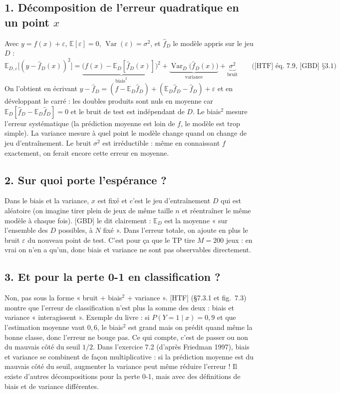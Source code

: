 \documentclass[10pt,a4paper]{article}
\begin{document}
\subsection*{1. Décomposition de l'erreur quadratique en un point $x$}
Avec $y = f(x) + \varepsilon$, $\mathbb{E}[\varepsilon]=0$, $\operatorname{Var}(\varepsilon)=\sigma^2$, et $\hat f_D$ le modèle appris sur le jeu $D$ :
\[
\mathbb{E}_{D,\varepsilon}\big[(y-\hat f_D(x))^2\big]
= \underbrace{\big(f(x)-\mathbb{E}_D[\hat f_D(x)]\big)^2}_{\text{biais}^2}
+ \underbrace{\operatorname{Var}_D\big(\hat f_D(x)\big)}_{\text{variance}}
+ \underbrace{\sigma^2}_{\text{bruit}}
\qquad\text{([HTF] éq.~7.9, [GBD] §3.1)}
\]
On l'obtient en écrivant $y-\hat f_D = (f-\mathbb{E}_D\hat f_D) + (\mathbb{E}_D\hat f_D - \hat f_D) + \varepsilon$ et en développant le carré : les doubles produits sont nuls en moyenne car $\mathbb{E}_D[\hat f_D - \mathbb{E}_D\hat f_D]=0$ et le bruit de test est indépendant de $D$.
Le biais$^2$ mesure l'erreur systématique (la prédiction moyenne est loin de $f$, le modèle est trop simple). La variance mesure à quel point le modèle change quand on change de jeu d'entraînement. Le bruit $\sigma^2$ est irréductible : même en connaissant $f$ exactement, on ferait encore cette erreur en moyenne.

\subsection*{2. Sur quoi porte l'espérance ?}
Dans le biais et la variance, $x$ est fixé et c'est le jeu d'entraînement $D$ qui est aléatoire (on imagine tirer plein de jeux de même taille $n$ et réentraîner le même modèle à chaque fois). [GBD] le dit clairement : $\mathbb{E}_D$ est la moyenne « sur l'ensemble des $D$ possibles, à $N$ fixé ». Dans l'erreur totale, on ajoute en plus le bruit $\varepsilon$ du nouveau point de test. C'est pour ça que le TP tire $M=200$ jeux : en vrai on n'en a qu'un, donc biais et variance ne sont pas observables directement.

\subsection*{3. Et pour la perte 0-1 en classification ?}
Non, pas sous la forme « bruit + biais$^2$ + variance ». [HTF] (§7.3.1 et fig.~7.3) montre que l'erreur de classification n'est plus la somme des deux : biais et variance « interagissent ». Exemple du livre : si $P(Y=1\mid x)=0{,}9$ et que l'estimation moyenne vaut $0{,}6$, le biais$^2$ est grand mais on prédit quand même la bonne classe, donc l'erreur ne bouge pas. Ce qui compte, c'est de passer ou non du mauvais côté du seuil $1/2$. Dans l'exercice 7.2 (d'après Friedman 1997), biais et variance se combinent de façon multiplicative : si la prédiction moyenne est du mauvais côté du seuil, augmenter la variance peut même réduire l'erreur ! Il existe d'autres décompositions pour la perte 0-1, mais avec des définitions de biais et de variance différentes.
\end{document}
